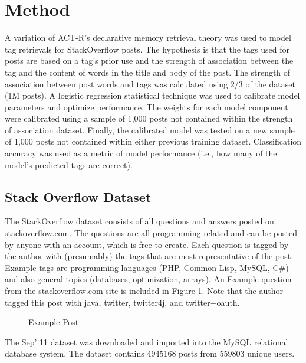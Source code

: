 \documentclass[10pt,letterpaper]{article}
\begin{document}
\section{Method}

A variation of ACT-R's declarative memory retrieval theory \cite{Anderson2004} was used to model tag retrievals for StackOverflow posts.
The hypothesis is that the tags used for posts are based on a tag's prior use and the strength of association between the tag and the content of words in the title and body of the post.
The strength of association between post words and tags was calculated using 2/3 of the dataset (1M posts).
A logistic regression statistical technique was used to calibrate model parameters and optimize performance.
The weights for each model component were calibrated using a sample of 1,000 posts not contained within the strength of association dataset.
Finally, the calibrated model was tested on a new sample of 1,000 posts not contained within either previous training dataset.
Classification accuracy was used as a metric of model performance (i.e., how many of the model's predicted tags are correct).

\subsection{Stack Overflow Dataset}

The StackOverflow dataset consists of all questions and answers posted on stackoverflow.com.
The questions are all programming related and can be posted by anyone with an account, which is free to create.
Each question is tagged by the author with (presumably) the tags that are most representative of the post.
Example tags are programming languages (PHP, Common-Lisp, MySQL, C\#) and also general topics (databases, optimization, arrays).
An Example question from the stackoverflow.com site is included in Figure \ref{fig:examplePost}.
Note that the author tagged this post with java, twitter, twitter4j, and twitter−oauth.

\begin{figure}[ht]
  \centering
  \caption{Example Post}
  \label{fig:examplePost}
\end{figure}


The Sep' 11 dataset \cite{DataDump2011} was downloaded and imported into the MySQL relational database system.
The dataset contains \num{4945168} posts from \num{559803} unique users.
\end{document}
